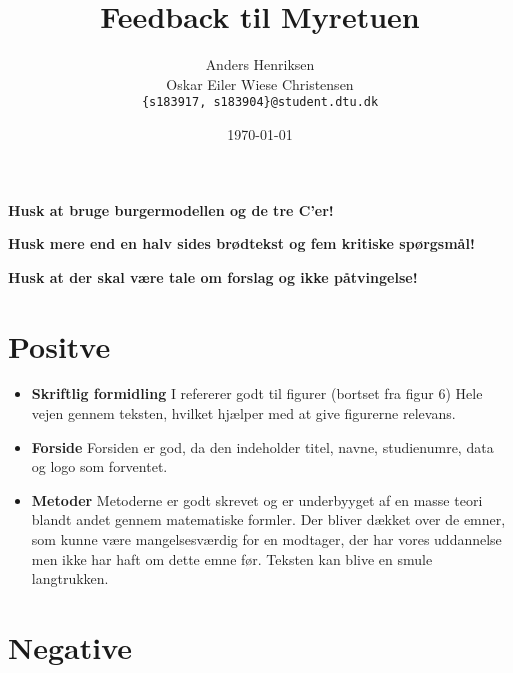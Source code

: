 \documentclass[11pt, fleqn, titlepage]{article}
\title{Feedback til Myretuen}
\author{Anders Henriksen \\ Oskar Eiler Wiese Christensen  \\ \texttt{\{s183917, s183904\}@student.dtu.dk}}
\date{\today}
\begin{document}
	
	\maketitle
	
	\textbf{Husk at bruge burgermodellen og de tre C'er!}
	
	\textbf{Husk mere end en halv sides brødtekst og fem kritiske spørgsmål!}
	
	\textbf{Husk at der skal være tale om forslag og ikke påtvingelse!}
	
	\section{Positve}
	
	\begin{itemize}
		\item \textbf{Skriftlig formidling} I refererer godt til figurer (bortset fra figur 6) Hele vejen gennem teksten, hvilket hjælper med at give figurerne relevans. 
		
		\item \textbf{Forside} Forsiden er god, da den indeholder titel, navne, studienumre, data og logo som forventet.
		
		\item \textbf{Metoder} Metoderne er godt skrevet og er underbyyget af en masse teori blandt andet gennem matematiske formler. Der bliver dækket over de emner, som kunne være mangelsesværdig for en modtager, der har vores uddannelse men ikke har haft om dette emne før. Teksten kan blive en smule langtrukken.
		
	\end{itemize}
	
	\section{Negative}
	
\end{document}
